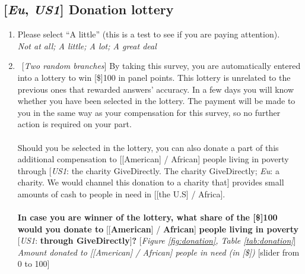 \documentclass[12pt,english]{article}
\begin{document}
\subsection*{[\textit{Eu}, \textit{US1}] Donation lottery}
\begin{enumerate}[resume] \item Please select ``A little'' (this is a test to see if you are paying attention).
\\ \textit{Not at all; A little; A lot; A great deal}
\item ~[\textit{Two random branches}] \label{q:donation} By taking this survey, you are automatically entered into a lottery to win [\$]100 in panel points. This lottery is unrelated to the previous ones that rewarded answers' accuracy. In a few days you will know whether you have been selected in the lottery. The payment will be made to you in the same way as your compensation for this survey, so no further action is required on your part.\\
\\
Should you be selected in the lottery, you can also donate a part of this additional compensation to [[American] / African] people living in poverty through [\textit{US1}: the charity GiveDirectly. The charity GiveDirectly; \textit{Eu}: a charity. We would channel this donation to a charity that] provides small amounts of cash to people in need in [[the U.S] / Africa].\\
\\
\textbf{In case you are winner of the lottery, what share of the [\$]100 would you donate to} [[\textbf{American}] / \textbf{African}] \textbf{people living in poverty} [\textit{US1}: \textbf{through GiveDirectly}]\textbf{?}  [\textit{Figure \ref{fig:donation}, Table \ref{tab:donation}}]
\\ \textit{Amount donated to [[American] / African] people in need (in [\$])} [slider from 0 to 100]
\end{enumerate}
\end{document}
